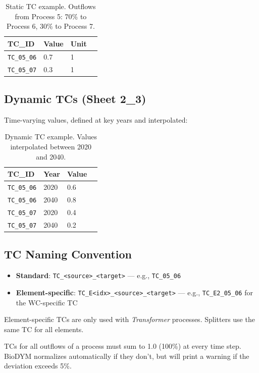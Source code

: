 \begin{table}[h]
\centering
\begin{tabular}{llll}
\toprule
\textbf{TC\_ID} & \textbf{Value} & \textbf{Unit} \\
\midrule
\texttt{TC\_05\_06} & 0.7 & 1 \\
\texttt{TC\_05\_07} & 0.3 & 1 \\
\bottomrule
\end{tabular}
\caption{Static TC example. Outflows from Process 5: 70\% to Process 6, 30\% to Process 7.}
\end{table}

\subsection{Dynamic TCs (Sheet 2\_3)}

Time-varying values, defined at key years and interpolated:

\begin{table}[h]
\centering
\begin{tabular}{llll}
\toprule
\textbf{TC\_ID} & \textbf{Year} & \textbf{Value} \\
\midrule
\texttt{TC\_05\_06} & 2020 & 0.6 \\
\texttt{TC\_05\_06} & 2040 & 0.8 \\
\texttt{TC\_05\_07} & 2020 & 0.4 \\
\texttt{TC\_05\_07} & 2040 & 0.2 \\
\bottomrule
\end{tabular}
\caption{Dynamic TC example. Values interpolated between 2020 and 2040.}
\end{table}

\subsection{TC Naming Convention}

\begin{itemize}
  \item \textbf{Standard}: \texttt{TC\_<source>\_<target>} --- e.g., \texttt{TC\_05\_06}
  \item \textbf{Element-specific}: \texttt{TC\_E<idx>\_<source>\_<target>} --- e.g., \texttt{TC\_E2\_05\_06} for the WC-specific TC
\end{itemize}

Element-specific TCs are only used with \emph{Transformer} processes. Splitters use the same TC for all elements.

\begin{warnbox}
TCs for all outflows of a process must sum to 1.0 (100\%) at every time step. BioDYM normalizes automatically if they don't, but will print a warning if the deviation exceeds 5\%.
\end{warnbox}

